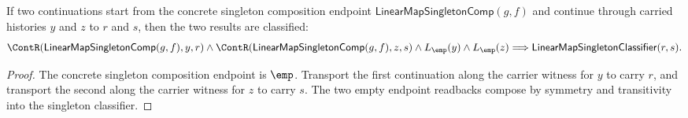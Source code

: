 \begin{theorem}
\label{thm:linearmap-singleton-comp-continuation-pair-classifier}
If two continuations start from the concrete singleton composition endpoint
\(\mathsf{LinearMapSingletonComp}(g,f)\) and continue through carried histories
\(y\) and \(z\) to \(r\) and \(s\), then the two results are classified:
$$
\ContR(\mathsf{LinearMapSingletonComp}(g,f),y,r)\land
\ContR(\mathsf{LinearMapSingletonComp}(g,f),z,s)\land
L_{\emp}(y)\land L_{\emp}(z)
\Longrightarrow
\mathsf{LinearMapSingletonClassifier}(r,s).
$$
\end{theorem}
\begin{proof}
The concrete singleton composition endpoint is \(\emp\). Transport the first
continuation along the carrier witness for \(y\) to carry \(r\), and transport
the second along the carrier witness for \(z\) to carry \(s\). The two empty
endpoint readbacks compose by symmetry and transitivity into the singleton
classifier.
\end{proof}
